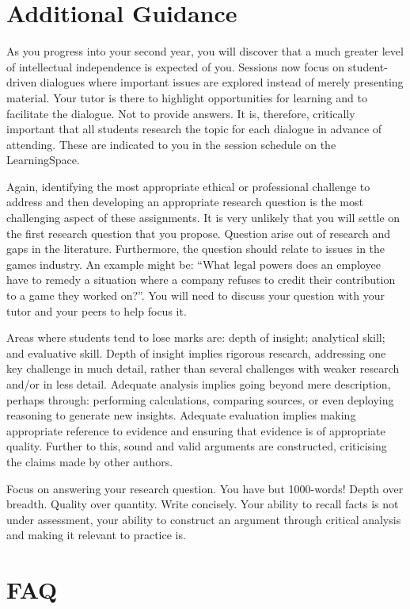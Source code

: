 \documentclass{../../fal_assignment}
\begin{document}
\section*{Additional Guidance}

As you progress into your second year, you will discover that a much greater level of intellectual independence is expected of you. Sessions now focus on student-driven dialogues where important issues are explored instead of merely presenting material. Your tutor is there to highlight opportunities for learning and to facilitate the dialogue. Not to provide answers. It is, therefore, critically important that all students research the topic for each dialogue in advance of attending. These are indicated to you in the session schedule on the LearningSpace.

Again, identifying the most appropriate ethical or professional challenge to address and then developing an appropriate research question is the most challenging aspect of these assignments. It is very unlikely that you will settle on the first research question that you propose. Question arise out of research and gaps in the literature. Furthermore, the question should relate to issues in the games industry. An example might be: ``What legal powers does an employee have to remedy a situation where a company refuses to credit their contribution to a game they worked on?''. You will need to discuss your question with your tutor and your peers to help focus it.

Areas where students tend to lose marks are: depth of insight; analytical skill; and evaluative skill. Depth of insight implies rigorous research, addressing one key challenge in much detail, rather than several challenges with weaker research and/or in less detail. Adequate analysis implies going beyond mere description, perhaps through: performing calculations, comparing sources, or even deploying reasoning to generate new insights. Adequate evaluation implies making appropriate reference to evidence and ensuring that evidence is of appropriate quality. Further to this, sound and valid arguments are constructed, criticising the claims made by other authors.

Focus on answering your research question. You have but 1000-words! Depth over breadth. Quality over quantity. Write concisely. Your ability to recall facts is not under assessment, your ability to construct an argument through critical analysis and making it relevant to practice is.

\section*{FAQ}
\end{document}
